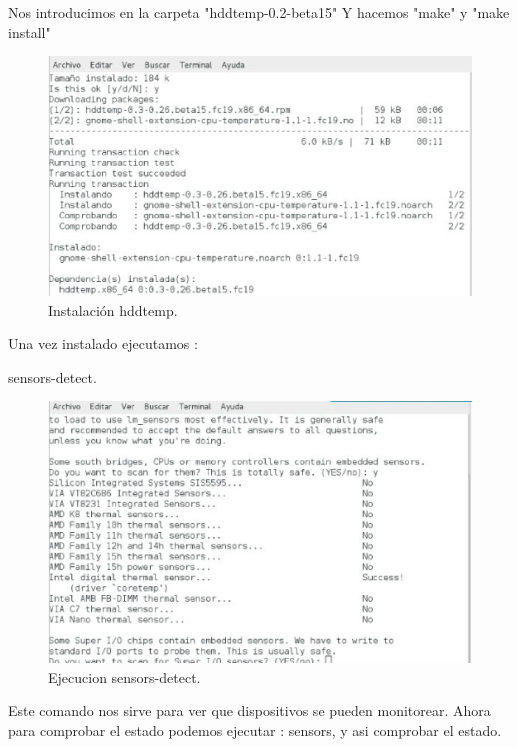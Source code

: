 Nos introducimos en la carpeta "hddtemp-0.2-beta15"
 Y hacemos "make" y "make install"

\begin{figure}[H]
\begin{center}
\includegraphics[scale=0.6]{imagenes/ejercicio6-5.eps}
\caption{Instalación hddtemp.}
\end{center}
\end{figure}



Una vez instalado ejecutamos :

sensors-detect.

\begin{figure}[H]
\begin{center}
\includegraphics[scale=0.6]{imagenes/ejercicio6-6.eps}
\caption{Ejecucion sensors-detect.}
\end{center}
\end{figure}

Este comando nos sirve para ver que dispositivos se pueden monitorear. Ahora para comprobar el estado podemos ejecutar : sensors, y asi comprobar el estado.

